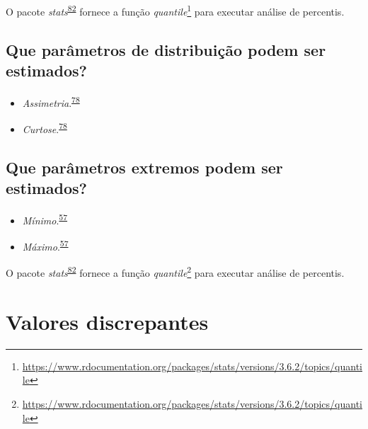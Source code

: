 \documentclass[
  a4paper,
]{book}
\renewcommand{\href}[2]{#2\footnote{\url{#1}}}
\newenvironment{infobox}[1]
  {
  \begin{itemize}
  \renewcommand{\labelitemi}{
    \raisebox{-.7\height}[0pt][0pt]{
      {\setkeys{Gin}{width=3em,keepaspectratio}
        \texttt{[image: \#1]}}
    }
  }
  \setlength{\fboxsep}{1em}
  \begin{blackbox}
  \item
  }
  {
  \end{blackbox}
  \end{itemize}
  }
\begin{document}
\begin{infobox}{images/Rlogo}
O pacote \emph{stats}\textsuperscript{\protect\hyperlink{ref-base}{82}} fornece a função \href{https://www.rdocumentation.org/packages/stats/versions/3.6.2/topics/quantile}{\emph{quantile}} para executar análise de percentis.

\end{infobox}

\hypertarget{que-paruxe2metros-de-distribuiuxe7uxe3o-podem-ser-estimados}{%
\subsection{Que parâmetros de distribuição podem ser estimados?}\label{que-paruxe2metros-de-distribuiuxe7uxe3o-podem-ser-estimados}}

\begin{itemize}
\item
  \emph{Assimetria}.\textsuperscript{\protect\hyperlink{ref-kanji2006}{78}}
\item
  \emph{Curtose}.\textsuperscript{\protect\hyperlink{ref-kanji2006}{78}}
\end{itemize}

\hypertarget{que-paruxe2metros-extremos-podem-ser-estimados}{%
\subsection{Que parâmetros extremos podem ser estimados?}\label{que-paruxe2metros-extremos-podem-ser-estimados}}

\begin{itemize}
\item
  \emph{Mínimo}.\textsuperscript{\protect\hyperlink{ref-Ali2016}{57}}
\item
  \emph{Máximo}.\textsuperscript{\protect\hyperlink{ref-Ali2016}{57}}
\end{itemize}

\begin{infobox}{images/Rlogo}
O pacote \emph{stats}\textsuperscript{\protect\hyperlink{ref-base}{82}} fornece a função \href{https://www.rdocumentation.org/packages/stats/versions/3.6.2/topics/quantile}{\emph{quantile}} para executar análise de percentis.

\end{infobox}

\hypertarget{outliers}{%
\section{Valores discrepantes}\label{outliers}}
\end{document}
